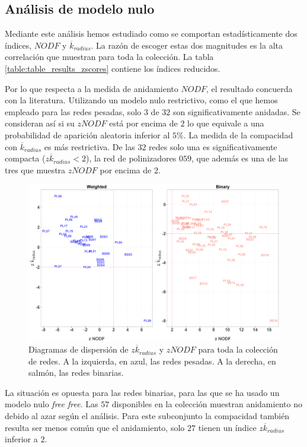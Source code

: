 \subsection{Análisis de modelo nulo}

Mediante este análisis hemos estudiado como se comportan estadísticamente dos índices, $NODF$ y $\overline k_{radius}$. La razón de escoger estas dos magnitudes es la alta correlación que
muestran para toda la colección. La tabla \ref{table:table_results_zscores} contiene los índices reducidos.

Por lo que respecta a la medida de anidamiento $NODF$, el resultado concuerda con la literatura. Utilizando un modelo nulo restrictivo, como el que hemos empleado para las redes pesadas, solo $3$ de $32$ son significativamente anidadas. Se consideran así si su $zNODF$ está por encima de $2$ lo que equivale a una probabilidad de aparición aleatoria inferior al $5\%$.
La medida de la compacidad con $\overline {k}_{radius}$ es más restrictiva. De las $32$ redes solo una es significativamente compacta ($z\overline {k}_{radius} < 2$), la red de polinizadores $059$, que además es una de las tres que muestra $zNODF$ por encima de $2$.

\begin{figure}[h!]
\centering
\includegraphics[scale=0.35]{Figures/ESTATICA_zscores_all.eps}
\caption {Diagramas de dispersión de $z\overline k_{radius}$ y $zNODF$ para toda la colección de redes. A la izquierda, en azul, las redes pesadas. A la derecha, en salmón, las redes binarias.}
\label{fig:ESTATICA_zscore_all}
\end{figure}

La situación es opuesta para las redes binarias, para las que se ha usado un modelo nulo \textit{free free}. Las $57$ disponibles en la colección muestran anidamiento no debido al azar según el análisis. Para este subconjunto la compacidad también resulta ser menos común que el anidamiento, solo $27$ tienen un índice $z\overline {k}_{radius}$ inferior a $2$.

